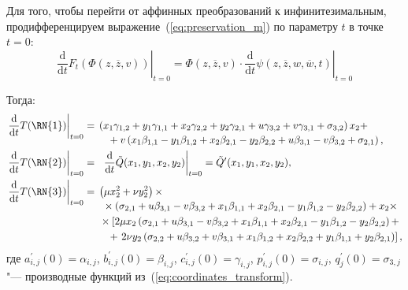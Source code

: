 \documentclass[a4paper,14pt]{extarticle}
\begin{document}
Для того, чтобы перейти от аффинных преобразований к инфинитезимальным, продифференцируем выражение~(\ref{eq:preservation_m}) по параметру $t$ в точке $t = 0$:
\begin{equation}
\left.\frac{\mathrm d}{\mathrm{d}t} F_t\left(\Phi(z, \overline{z}, v)\right)\right|_{t = 0} = \Phi(z, \overline{z}, v) \cdot \left.\frac{\mathrm d}{\mathrm{d}t}\psi(z, \overline{z}, w, \overline{w}, t)\right|_{t=0}
\end{equation}

Тогда:
\begin{align*}
\left.\frac{\mathrm d}{\mathrm{d}t}T(\mathrm{\RN{1}})\right|_{t = 0} &= 
\begin{multlined}[t]
\left(x_1 \gamma_{1,2}+y_1 \gamma_{1,1}+x_2 \gamma_{2,2}+y_2 \gamma_{2,1} + u \gamma_{3,2}+v \gamma_{3,1}+\sigma_{3,2}\right) x_2 + \\ 
 + v \left(x_1 \beta_{1,1}-y_1 \beta_{1,2}+x_2 \beta_{2,1}-y_2 \beta_{2,2} + u \beta_{3,1}-v \beta_{3,2}+\sigma_{2,1}\right),
\end{multlined}\\
\left.\frac{\mathrm d}{\mathrm{d}t}T(\mathrm{\RN{2}})\right|_{t = 0} &= 
\begin{multlined}[t]
\ \left.\frac{\mathrm d}{\mathrm{d}t}\tilde{Q}(x_1,y_1,x_2,y_2)\right|_{t=0} = \tilde{Q}^{\prime}(x_1,y_1,x_2,y_2),
\end{multlined}\\
\left.\frac{\mathrm d}{\mathrm{d}t}T(\mathrm{\RN{3}})\right|_{t = 0} &= 
\begin{multlined}[t]
\left(\mu  x_2^2+\nu  y_2^2\right) \times \\
\times\left(\sigma _{2,1}+u \beta _{3,1}-v \beta _{3,2}+x_1 \beta _{1,1}+x_2 \beta _{2,1}-y_1 \beta _{1,2}-y_2 \beta_{2,2}\right)+x_2 \times \\
\times\left[2 \mu  x_2 \left(\sigma _{2,1}+u \beta _{3,1}-v \beta _{3,2}+x_1 \beta _{1,1}+x_2 \beta _{2,1}-y_1 \beta _{1,2}-y_2 \beta_{2,2}\right)+\right. \\
+ \left.2 \nu  y_2 \left(\sigma _{2,2}+u \beta _{3,2}+v \beta _{3,1}+x_1 \beta _{1,2}+x_2 \beta _{2,2}+y_1 \beta _{1,1}+y_2 \beta_{2,1}\right)\right],
\end{multlined}
\end{align*}
где $a^{\prime}_{i,j}(0) = \alpha_{i,j}$, $b^{\prime}_{i,j}(0) = \beta_{i,j}$, $c^{\prime}_{i,j}(0) = \gamma_{i,j}$, $p^{\prime}_{i,j}(0) = \sigma_{i,j}$, $q^{\prime}_{j}(0) = \sigma_{3,j}$ "--- производные функций из~(\ref{eq:coordinates_transform}). 
\end{document}
